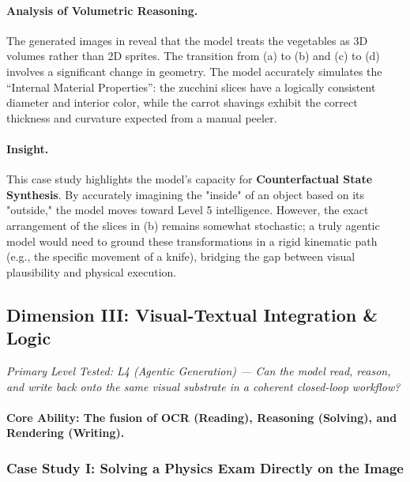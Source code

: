 \documentclass{llmxive}
\begin{document}
\paragraph{Analysis of Volumetric Reasoning.}
The generated images in  reveal that the model treats the vegetables as 3D volumes rather than 2D sprites. The transition from (a) to (b) and (c) to (d) involves a significant change in geometry. The model accurately simulates the ``Internal Material Properties'': the zucchini slices have a logically consistent diameter and interior color, while the carrot shavings exhibit the correct thickness and curvature expected from a manual peeler.

\paragraph{Insight.}
This case study highlights the model's capacity for \textbf{Counterfactual State Synthesis}. By accurately imagining the "inside" of an object based on its "outside," the model moves toward Level 5 intelligence. However, the exact arrangement of the slices in (b) remains somewhat stochastic; a truly agentic model would need to ground these transformations in a rigid kinematic path (e.g., the specific movement of a knife), bridging the gap between visual plausibility and physical execution.


\subsection{Dimension III: Visual-Textual Integration \& Logic}

\noindent\textit{Primary Level Tested: L4 (Agentic Generation) --- Can the model read, reason, and write back onto the same visual substrate in a coherent closed-loop workflow?}

\paragraph{Core Ability: The fusion of OCR (Reading), Reasoning (Solving), and Rendering (Writing).}

\subsubsection{Case Study I: Solving a Physics Exam Directly on the Image}
\label{subsubsec:physics_solver_case}
\end{document}

